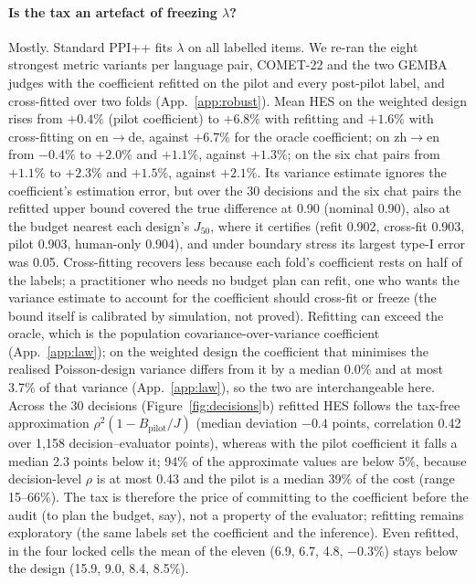 \documentclass[11pt]{article}
\newcommand{\Jt}{J_{50}}
\newcommand{\Bp}{B_{\mathrm{pilot}}}
\begin{document}
\paragraph{Is the tax an artefact of freezing $\lambda$?} Mostly. Standard PPI++ fits $\lambda$ on all labelled
items. We re-ran the eight strongest metric variants per language pair, COMET-22 and the two GEMBA judges with the
coefficient refitted on the pilot and every post-pilot label, and cross-fitted over two folds (App.~\ref{app:robust}). Mean HES on the weighted design rises from $+0.4\%$ (pilot coefficient) to
$+6.8\%$ with refitting and $+1.6\%$ with cross-fitting on en$\to$de, against $+6.7\%$ for the oracle coefficient; on
zh$\to$en from $-0.4\%$ to $+2.0\%$ and $+1.1\%$, against $+1.3\%$; on the six chat pairs from $+1.1\%$ to $+2.3\%$ and $+1.5\%$, against $+2.1\%$. Its variance estimate ignores the coefficient's estimation
error, but over the 30 decisions and the six chat pairs the refitted upper bound covered the true difference at 0.90
(nominal 0.90), also at the budget nearest each design's $\Jt$, where it certifies (refit 0.902, cross-fit 0.903,
pilot 0.903, human-only 0.904), and under boundary stress its largest type-I error was 0.05. Cross-fitting recovers
less because each fold's coefficient rests on half of the labels; a practitioner who needs no budget plan can refit,
one who wants the variance estimate to account for the coefficient should cross-fit or freeze (the bound itself is
calibrated by simulation, not proved). Refitting can exceed the oracle, which is the population
covariance-over-variance coefficient (App.~\ref{app:law}); on the weighted design the coefficient that minimises the
realised Poisson-design variance differs from it by a median 0.0\% and at most 3.7\% of that variance (App.~\ref{app:law}), so the two are interchangeable here. Across the 30 decisions (Figure~\ref{fig:decisions}b) refitted HES
follows the tax-free approximation $\rho^2(1-\Bp/J)$ (median deviation $-0.4$ points, correlation 0.42 over 1{,}158
decision--evaluator points), whereas with the pilot coefficient it falls a median 2.3 points below it; 94\% of the
approximate values are below 5\%, because decision-level $\rho$ is at most 0.43 and the pilot is a median 39\% of the cost (range 15--66\%). The tax is therefore the price of committing to the coefficient before the audit (to plan the budget, say), not a
property of the evaluator; refitting remains exploratory (the same labels set the coefficient and the inference). Even refitted, in the four locked cells the mean of the eleven (6.9, 6.7, 4.8, $-0.3\%$) stays below the design
(15.9, 9.0, 8.4, 8.5\%).
\end{document}
